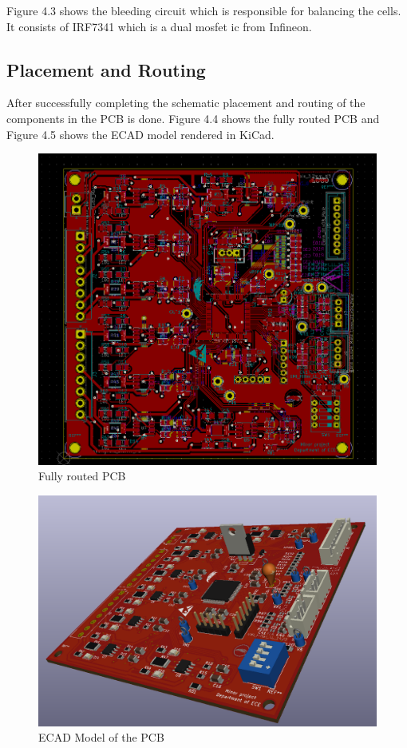 Figure 4.3 shows the bleeding circuit which is responsible for balancing the cells. It consists of IRF7341 which is a dual mosfet \acrshort{ic} from Infineon.

\subsection{Placement and Routing}

After successfully completing the schematic placement and routing of the components in the PCB is done. Figure 4.4 shows the fully routed PCB and Figure 4.5 shows the ECAD model rendered in KiCad.

\begin{figure}[H]
    \centering
    \includegraphics[scale=0.5]{Chapter4/Screenshot (56).png}
    \caption{Fully routed PCB}
\end{figure}

\begin{figure}[H]
    \centering
    \includegraphics[scale=0.4]{Chapter4/Screenshot (57).png}
    \caption{ECAD Model of the PCB}
\end{figure}


